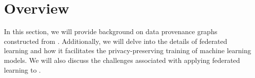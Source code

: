 \section{Overview}
\label{sec:motivation}


In this section, we will provide background on data provenance graphs constructed from \logs. Additionally, we will delve into the details of federated learning and how it facilitates the privacy-preserving training of machine learning models. We will also discuss the challenges associated with applying federated learning to \pids.




